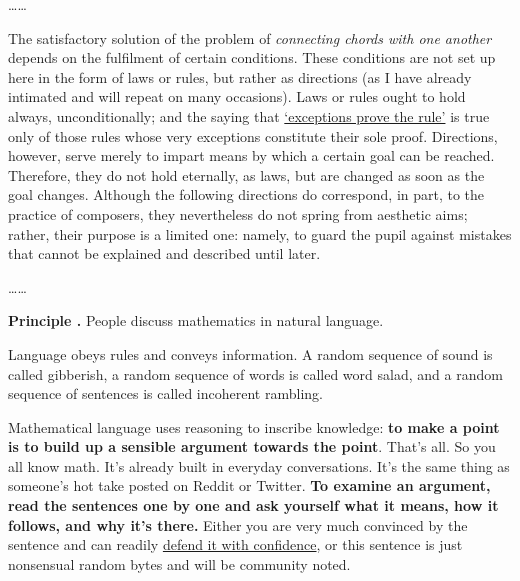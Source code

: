 \documentclass[oneside,12pt]{article}
\begin{document}
\begin{mdframed}
\ldots\ldots{}

The satisfactory solution of the problem of \emph{connecting chords with one another} depends on the fulfilment of certain conditions. These conditions are not set up here in the form of laws or rules, but rather as directions (as I have already intimated and will repeat on many occasions). Laws or rules ought to hold always, unconditionally; and the saying that \uline{`exceptions prove the rule'} is true only of those rules whose very exceptions constitute their sole proof. Directions, however, serve merely to impart means by which a certain goal can be reached. Therefore, they do not hold eternally, as laws, but are changed as soon as the goal changes. Although the following directions do correspond, in part, to the practice of composers, they nevertheless do not spring from aesthetic aims; rather, their purpose is a limited one: namely, to guard the pupil against mistakes that cannot be explained and described until later.

\ldots\ldots{}

\end{mdframed}

\leavevmode

\hspace{-0.75in} \textbf{Principle \foreignlanguage{greek}{\textalpha}.} People discuss mathematics in natural language.

\leavevmode

Language obeys rules and conveys information. A random sequence of sound is called gibberish, a random sequence of words is called word salad, and a random sequence of sentences is called incoherent rambling.

Mathematical language uses reasoning to inscribe knowledge: \textbf{to make a point is to build up a sensible argument towards the point}. That's all. So you all know math. It's already built in everyday conversations. It's the same thing as someone's hot take posted on Reddit or Twitter. \textbf{To examine an argument, read the sentences one by one and ask yourself what it means, how it follows, and why it's there.} Either you are very much convinced by the sentence and can readily \uline{defend it with confidence}, or this sentence is just nonsensual random bytes and will be community noted.
\end{document}
